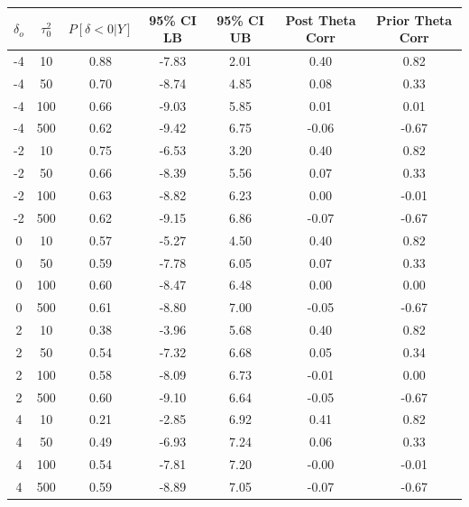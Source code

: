 \documentclass[11pt, letterpaper]{article}
\begin{document}
\begin{tabular}{||c c || c c c c c||}
    \hline
    $\delta_o$ & $\tau^2_0$ & $P[\delta < 0|Y]$	& 95\% CI LB & 95\% CI UB & Post Theta Corr & Prior Theta Corr \\
    \hline \hline
    -4 & 10 & 0.88 & -7.83 & 2.01 & 0.40 & 0.82 \\
    \hline
    -4 & 50 & 0.70 & -8.74 & 4.85 & 0.08 & 0.33 \\
    \hline
    -4 & 100 & 0.66 & -9.03 & 5.85 & 0.01 & 0.01 \\
    \hline
    -4 & 500 & 0.62 & -9.42 & 6.75 & -0.06 & -0.67 \\
    \hline
    -2 & 10 & 0.75 & -6.53 & 3.20 & 0.40 & 0.82 \\
    \hline
    -2 & 50 & 0.66 & -8.39 & 5.56 & 0.07 & 0.33 \\
    \hline
    -2 & 100 & 0.63 & -8.82 & 6.23 & 0.00 & -0.01 \\
    \hline
    -2 & 500 & 0.62 & -9.15 & 6.86 & -0.07 & -0.67 \\
    \hline
    0 & 10 & 0.57 & -5.27 & 4.50 & 0.40 & 0.82 \\
    \hline
    0 & 50 & 0.59 & -7.78 & 6.05 & 0.07 & 0.33 \\
    \hline
    0 & 100 & 0.60 & -8.47 & 6.48 & 0.00 & 0.00 \\ 
    \hline
    0 & 500 & 0.61 & -8.80 & 7.00 & -0.05 & -0.67 \\
    \hline
    2 & 10 & 0.38 & -3.96 & 5.68 & 0.40 & 0.82 \\
    \hline
    2 & 50 & 0.54 & -7.32 & 6.68 & 0.05 & 0.34 \\
    \hline
    2 & 100 & 0.58 & -8.09 & 6.73 & -0.01 & 0.00 \\
    \hline
    2 & 500 & 0.60 & -9.10 & 6.64 & -0.05 & -0.67 \\
    \hline
    4 & 10 & 0.21 & -2.85 & 6.92 & 0.41 & 0.82 \\
    \hline
    4 & 50 & 0.49 & -6.93 & 7.24 & 0.06 & 0.33 \\ 
    \hline
    4 & 100 & 0.54 & -7.81 & 7.20 & -0.00 & -0.01 \\
    \hline
    4 & 500 & 0.59 & -8.89 & 7.05 & -0.07 & -0.67 \\
    \hline

\end{tabular}
\end{document}
